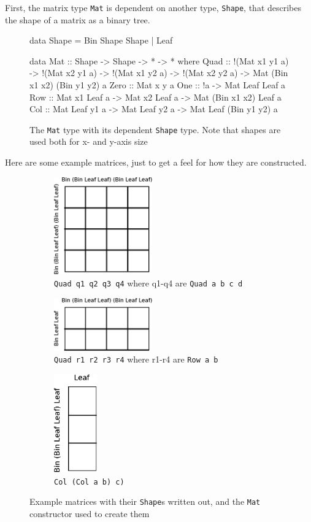 \documentclass[a4paper,12pt,twosided]{report}
\begin{document}
First, the matrix type \texttt{Mat} is dependent on another type,
\texttt{Shape}, that describes the shape of a matrix as a binary tree.

\begin{figure}[H]
\begin{code}
data Shape = Bin Shape Shape | Leaf

data Mat :: Shape -> Shape -> * -> * where
  Quad :: !(Mat x1 y1 a) -> !(Mat x2 y1 a) ->
          !(Mat x1 y2 a) -> !(Mat x2 y2 a) ->
          Mat (Bin x1 x2) (Bin y1 y2) a
  Zero :: Mat x y a
  One :: !a -> Mat Leaf Leaf a
  Row :: Mat x1 Leaf a -> Mat x2 Leaf a -> Mat (Bin x1 x2) Leaf a
  Col :: Mat Leaf y1 a -> Mat Leaf y2 a -> Mat Leaf (Bin y1 y2) a
\end{code}
\caption{\label{mat}The \texttt{Mat} type with its dependent \texttt{Shape}
type. Note that shapes are used both for x- and y-axis size}
\end{figure}

Here are some example matrices, just to get a feel for how they are constructed.
\begin{figure}[H]
\begin{subfigure}[H]{.3\textwidth}
\includegraphics[width=120pt]{example-matrix-4x4.eps}
\caption{\texttt{Quad q1 q2 q3 q4} where q1-q4 are \texttt{Quad a b c d}} 
\end{subfigure}
\hfill
\begin{subfigure}[H]{.3\textwidth}
\includegraphics[width=120pt]{example-matrix-2x4.eps}
\caption{\texttt{Quad r1 r2 r3 r4} where r1-r4 are \texttt{Row a b}}
\end{subfigure}
\hfill
\begin{subfigure}[H]{.3\textwidth}
\includegraphics[height=120pt]{example-matrix-3x1.eps}
\caption{\texttt{Col (Col a b) c)}}
\end{subfigure}
\caption{Example matrices with their \texttt{Shape}s written out, and the
\texttt{Mat} constructor used to create them}

\end{figure}
\end{document}
